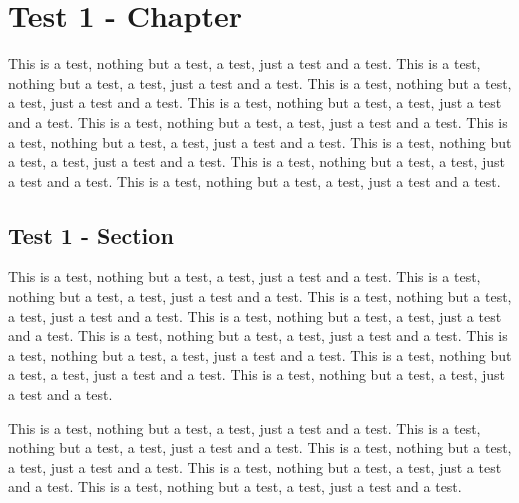 \documentclass[12pt,twoside]{report}
\begin{document}
\tableofcontents

\listoftables

\listoffigures

\clearpage


%
%
%
\chapter{Test 1 - Chapter}

This is a test, nothing but a test, a test, just a test and a test.
This is a test, nothing but a test, a test, just a test and a test.
This is a test, nothing but a test, a test, just a test and a test.
This is a test, nothing but a test, a test, just a test and a test.
This is a test, nothing but a test, a test, just a test and a test.
This is a test, nothing but a test, a test, just a test and a test.
This is a test, nothing but a test, a test, just a test and a test.
This is a test, nothing but a test, a test, just a test and a test.
This is a test, nothing but a test, a test, just a test and a test.

\section{Test 1 - Section}

This is a test, nothing but a test, a test, just a test and a test.
This is a test, nothing but a test, a test, just a test and a test.
This is a test, nothing but a test, a test, just a test and a test.
This is a test, nothing but a test, a test, just a test and a test.
This is a test, nothing but a test, a test, just a test and a test.
This is a test, nothing but a test, a test, just a test and a test.
This is a test, nothing but a test, a test, just a test and a test.
This is a test, nothing but a test, a test, just a test and a test.

This is a test, nothing but a test, a test, just a test and a test.
This is a test, nothing but a test, a test, just a test and a test.
This is a test, nothing but a test, a test, just a test and a test.
This is a test, nothing but a test, a test, just a test and a test.
This is a test, nothing but a test, a test, just a test and a test.
\end{document}
